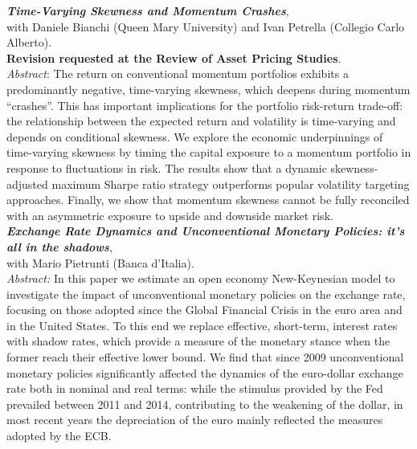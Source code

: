 \documentclass[a4paper,12pt]{article}
\begin{document}
\textit{\textbf{Time-Varying Skewness and Momentum Crashes}},\\ with Daniele Bianchi (Queen Mary University) and Ivan Petrella (Collegio Carlo Alberto).\\\textbf{Revision requested at the Review of Asset Pricing Studies}.\\[.5em]\textit{Abstract}:
The return on conventional momentum portfolios exhibits a predominantly negative, time-varying skewness, which deepens during momentum ``crashes''. This has important implications for the portfolio risk-return trade-off: the relationship between the expected return and volatility is time-varying and depends on conditional skewness. We explore the economic underpinnings of time-varying skewness by timing the capital exposure to a momentum portfolio in response to fluctuations in risk. The results show that a dynamic skewness-adjusted maximum Sharpe ratio strategy outperforms popular volatility targeting approaches. Finally, we show that momentum skewness cannot be fully reconciled with an asymmetric exposure to upside and downside market risk.\\[.5em]
\newpage
\textit{\textbf{Exchange Rate Dynamics and Unconventional Monetary Policies: it’s all in the shadows}},\\ with Mario Pietrunti (Banca d'Italia).\\ %
\textit{Abstract:} In this paper we estimate an open economy New-Keynesian model to investigate the impact of unconventional monetary policies on the exchange rate, focusing on those adopted since the Global Financial Crisis in the euro area and in the United States. To this end we replace effective, short-term, interest rates with shadow rates, which provide a measure of the monetary stance when the former reach their effective lower bound. We find that since 2009 unconventional monetary policies significantly affected the dynamics of the euro-dollar exchange rate both in nominal and real terms: while the stimulus provided by the Fed prevailed between 2011 and 2014, contributing to the weakening of the dollar, in most recent years the depreciation of the euro mainly reflected the measures adopted by the ECB.
\end{document}
